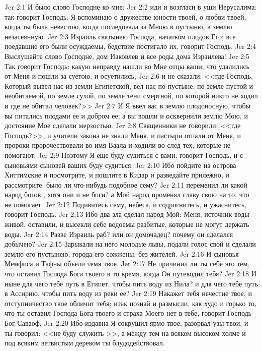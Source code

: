 \vs Jer 2:1 И было слово Господне ко мне:
\vs Jer 2:2 иди и возгласи в уши  Иерусалима: так говорит Господь: Я вспоминаю о дружестве юности твоей, о любви твоей, когда ты была невестою, когда последовала за Мною в пустыню, в землю незасеянную.
\vs Jer 2:3 Израиль  святынею Господа, начатком плодов Его; все поедавшие его были осуждаемы, бедствие постигало их, говорит Господь.
\rsbpar\vs Jer 2:4 Выслушайте слово Господне, дом Иаковлев и все роды дома Израилева!
\vs Jer 2:5 Так говорит Господь: какую неправду нашли во Мне отцы ваши, что удалились от Меня и пошли за суетою, и осуетились,
\vs Jer 2:6 и не сказали: <<где Господь, Который вывел нас из земли Египетской, вел нас по пустыне, по земле пустой и необитаемой, по земле сухой, по земле тени смертной, по которой никто не ходил и где не обитал человек?>>
\vs Jer 2:7 И Я ввел вас в землю плодоносную, чтобы вы питались плодами ее и добром ее; а вы вошли и осквернили землю Мою, и достояние Мое сделали мерзостью.
\vs Jer 2:8 Священники не говорили: <<где Господь?>>, и учители закона не знали Меня, и пастыри отпали от Меня, и пророки пророчествовали во имя Ваала и ходили во след тех, которые не помогают.
\vs Jer 2:9 Поэтому Я еще буду судиться с вами, говорит Господь, и с сыновьями сыновей ваших буду судиться.
\vs Jer 2:10 Ибо пойдите на острова Хиттимские и посмотрите, и пошлите в Кидар и разведайте прилежно, и рассмотрите: было ли  что-нибудь подобное сему?
\vs Jer 2:11 переменил ли какой народ богов , хотя они и не боги? а Мой народ променял славу свою на то, что не помогает.
\vs Jer 2:12 Подивитесь сему, небеса, и содрогнитесь, и ужаснитесь, говорит Господь.
\vs Jer 2:13 Ибо два зла сделал народ Мой: Меня, источник воды живой, оставили, и высекли себе водоемы разбитые, которые не могут держать воды.
\vs Jer 2:14 Разве Израиль раб? или он домочадец? почему он сделался добычею?
\vs Jer 2:15 Зарыкали на него молодые львы, подали голос свой и сделали землю его пустынею; города его сожжены, без жителей.
\vs Jer 2:16 И сыновья Мемфиса и Тафны объели темя твое.
\vs Jer 2:17 Не причинил ли ты себе это тем, что оставил Господа Бога твоего в то время, когда Он путеводил тебя?
\vs Jer 2:18 И ныне для чего тебе путь в Египет, чтобы пить воду из Нила? и для чего тебе путь в Ассирию, чтобы пить воду из реки ее?
\vs Jer 2:19 Накажет тебя нечестие твое, и отступничество твое обличит тебя; итак познай и размысли, как худо и горько то, что ты оставил Господа Бога твоего и страха Моего нет в тебе, говорит Господь Бог Саваоф.
\vs Jer 2:20 Ибо издавна Я сокрушил ярмо твое, разорвал узы твои, и ты говорил: <<не буду служить >>, а между тем на всяком высоком холме и под всяким ветвистым деревом ты блудодействовал.
